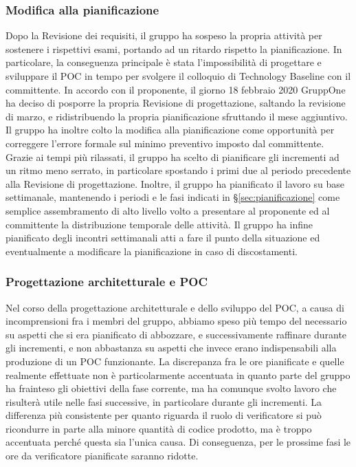 \documentclass[../piano-di-progetto.tex]{subfiles}
\begin{document}
\subsubsection{Modifica alla pianificazione}%
\label{subs:modifica_alla_pianificazione}

Dopo la Revisione dei requisiti, il gruppo ha sospeso la propria attività per sostenere i rispettivi esami, portando ad un ritardo rispetto la pianificazione.
In particolare, la conseguenza principale è stata l'impossibilità di progettare e sviluppare il POC in tempo per svolgere il colloquio di Technology Baseline con il committente.
In accordo con il proponente, il giorno 18 febbraio 2020 GruppOne ha deciso di posporre la propria Revisione di progettazione, saltando la revisione di marzo, e ridistribuendo la propria pianificazione sfruttando il mese aggiuntivo.
Il gruppo ha inoltre colto la modifica alla pianificazione come opportunità per correggere l'errore formale sul minimo preventivo imposto dal committente.
Grazie ai tempi più rilassati, il gruppo ha scelto di pianificare gli incrementi ad un ritmo meno serrato, in particolare spostando i primi due al periodo precedente alla Revisione di progettazione.
Inoltre, il gruppo ha pianificato il lavoro su base settimanale, mantenendo i periodi e le fasi indicati in §\ref{sec:pianificazione} come semplice assembramento di alto livello volto a presentare al proponente ed al committente la distribuzione temporale delle attività.
Il gruppo ha infine pianificato degli incontri settimanali atti a fare il punto della situazione ed eventualmente a modificare la pianificazione in caso di discostamenti.

\subsubsection{Progettazione architetturale e POC}%
\label{subs:progettazione_architetturale_e_poc}

Nel corso della progettazione architetturale e dello sviluppo del POC, a causa di incomprensioni fra i membri del gruppo, abbiamo speso più tempo del necessario su aspetti che si era pianificato di abbozzare, e successivamente raffinare durante gli incrementi, e non abbastanza su aspetti che invece erano indispensabili alla produzione di un POC funzionante.
La discrepanza fra le ore pianificate e quelle realmente effettuate non è particolarmente accentuata in quanto parte del gruppo ha frainteso gli obiettivi della fase corrente, ma ha comunque svolto lavoro che risulterà utile nelle fasi successive, in particolare durante gli incrementi.
La differenza più consistente per quanto riguarda il ruolo di verificatore si può ricondurre in parte alla minore quantità di codice prodotto, ma è troppo accentuata perché questa sia l'unica causa.
Di conseguenza, per le prossime fasi le ore da verificatore pianificate saranno ridotte.
\end{document}
